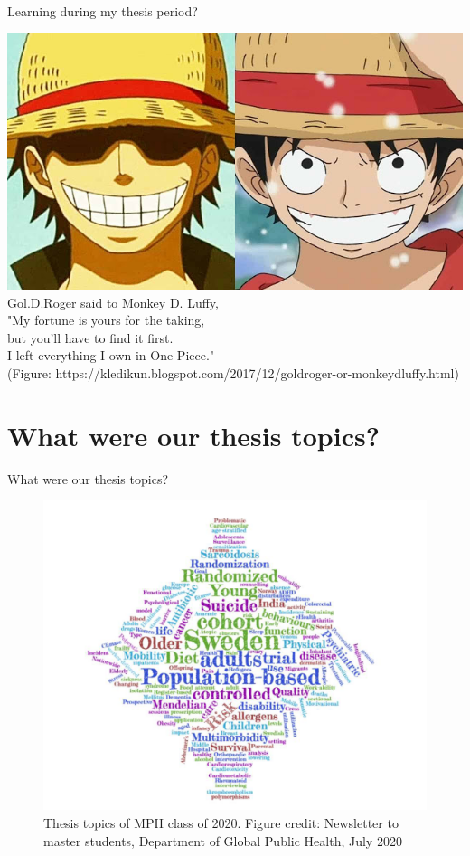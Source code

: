 \documentclass{beamer}
\begin{document}
\begin{frame}[allowframebreaks]{Learning during my thesis period?}

\center
\includegraphics[scale=0.4]{image/Gol-D-Roger-Is-Luffy.jpg} \\
Gol.D.Roger said to Monkey D. Luffy, \\"My fortune is yours for the taking, \\
but you'll have to find it first.\\ I left everything I own in One Piece." \\

\tiny (Figure: https://kledikun.blogspot.com/2017/12/goldroger-or-monkeydluffy.html)


\end{frame}

\section{What were our thesis topics?}
\begin{frame}{What were our thesis topics?}
		\begin{figure}
		\center
		\includegraphics[scale=0.4]{image/thesistopics}
		\caption{\small Thesis topics of MPH class of 2020. Figure credit: Newsletter to master students, Department of Global Public Health, July 2020}
		\end{figure}

		
\end{frame}
\end{document}
